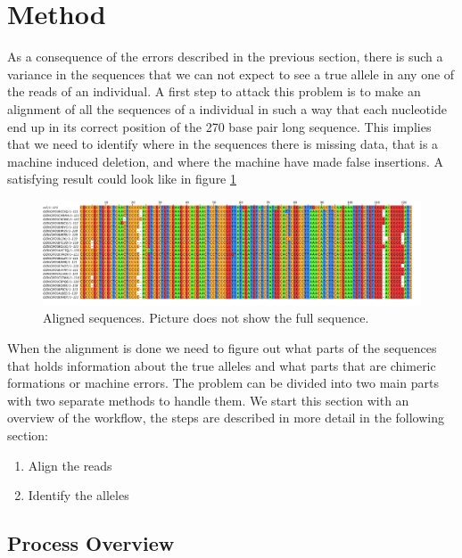 \section{Method}

As a consequence of the errors described in the previous section, there is such a variance in the sequences that we can not expect to see a true allele in any one of the reads of an individual. A first step to attack this problem is to make an alignment of all the sequences of a individual in such a way that each nucleotide end up in its correct position of the 270 base pair long sequence. This implies that we need to identify where in the sequences there is missing data, that is a machine induced deletion, and where the machine have made false insertions. A satisfying result could look like in figure \ref{fig:dream_scenario}

\begin{figure}[ht]
	\centering
		\includegraphics[width=\textwidth]{../pictures/align_with_ref_cropped.png}
	\caption{Aligned sequences. Picture does not show the full sequence.}
	\label{fig:dream_scenario}
\end{figure}


When the alignment is done we need to figure out what parts of the sequences that holds information about the true alleles and what parts that are chimeric formations or machine errors. The problem can be divided into two main parts with two separate methods to handle them. We start this section with an overview of the workflow, the steps are described in more detail in the following section:

\begin{enumerate}
	\item Align the reads
	\item Identify the alleles
\end{enumerate}

\subsection{Process Overview}

